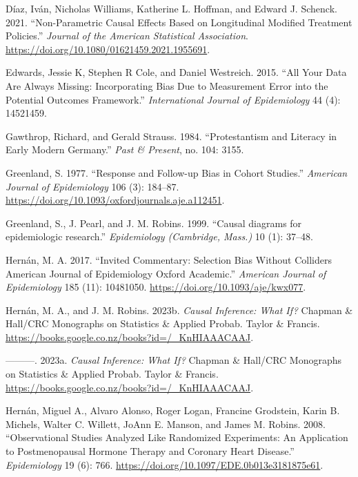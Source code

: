 \documentclass[
  singlecolumn]{article}
\newlength{\cslhangindent}
\newlength{\cslentryspacingunit} %
\newenvironment{CSLReferences}[2] %
 {%
  \setlength{\parindent}{0pt}
  \ifodd #1
  \let\oldpar\par
  \def\par{\hangindent=\cslhangindent\oldpar}
  \fi
  \setlength{\parskip}{#2\cslentryspacingunit}
 }%
 {}
\begin{document}
\begin{CSLReferences}{1}{0}
\leavevmode{}%
Díaz, Iván, Nicholas Williams, Katherine L. Hoffman, and Edward J.
Schenck. 2021. {``Non-Parametric Causal Effects Based on Longitudinal
Modified Treatment Policies.''} \emph{Journal of the American
Statistical Association}.
\url{https://doi.org/10.1080/01621459.2021.1955691}.

\leavevmode{}%
Edwards, Jessie K, Stephen R Cole, and Daniel Westreich. 2015. {``All
Your Data Are Always Missing: Incorporating Bias Due to Measurement
Error into the Potential Outcomes Framework.''} \emph{International
Journal of Epidemiology} 44 (4): 14521459.

\leavevmode{}%
Gawthrop, Richard, and Gerald Strauss. 1984. {``Protestantism and
Literacy in Early Modern Germany.''} \emph{Past \& Present}, no. 104:
3155.

\leavevmode{}%
Greenland, S. 1977. {``Response and Follow-up Bias in Cohort Studies.''}
\emph{American Journal of Epidemiology} 106 (3): 184--87.
\url{https://doi.org/10.1093/oxfordjournals.aje.a112451}.

\leavevmode{}%
Greenland, S., J. Pearl, and J. M. Robins. 1999. {``Causal diagrams for
epidemiologic research.''} \emph{Epidemiology (Cambridge, Mass.)} 10
(1): 37--48.

\leavevmode{}%
Hernán, M. A. 2017. {``Invited Commentary: Selection Bias Without
Colliders \textbar{} American Journal of Epidemiology \textbar{} Oxford
Academic.''} \emph{American Journal of Epidemiology} 185 (11): 10481050.
\url{https://doi.org/10.1093/aje/kwx077}.

\leavevmode{}%
Hernán, M. A., and J. M. Robins. 2023b. \emph{Causal Inference: What
If?} Chapman \& Hall/CRC Monographs on Statistics \& Applied Probab.
Taylor \& Francis.
\url{https://books.google.co.nz/books?id=/_KnHIAAACAAJ}.

\leavevmode{}%
---------. 2023a. \emph{Causal Inference: What If?} Chapman \& Hall/CRC
Monographs on Statistics \& Applied Probab. Taylor \& Francis.
\url{https://books.google.co.nz/books?id=/_KnHIAAACAAJ}.

\leavevmode{}%
Hernán, Miguel A., Alvaro Alonso, Roger Logan, Francine Grodstein, Karin
B. Michels, Walter C. Willett, JoAnn E. Manson, and James M. Robins.
2008. {``Observational Studies Analyzed Like Randomized Experiments: An
Application to Postmenopausal Hormone Therapy and Coronary Heart
Disease.''} \emph{Epidemiology} 19 (6): 766.
\url{https://doi.org/10.1097/EDE.0b013e3181875e61}.


\end{CSLReferences}
\end{document}
